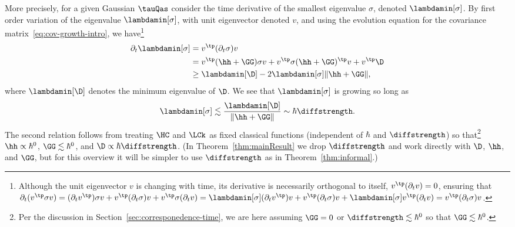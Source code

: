 \documentclass{article}
\numberwithin{equation}{section}
\begin{document}
More precisely, for a given Gaussian $\tauQas$ consider the time derivative of the smallest eigenvalue $\sigma$, denoted $\lambdamin[\sigma]$.
By first order variation
of the eigenvalue $\lambdamin[\sigma]$, with unit eigenvector denoted $v$, and using the evolution equation for the covariance matrix~\eqref{eq:cov-growth-intro},
we have\footnote{Although the unit eigenvector $v$ is changing with time, its derivative is necessarily orthogonal to itself, $v^\tp (\partial_t v)=0$, ensuring that $\partial_t (v^\tp \sigma v) = (\partial_t v^\tp) \sigma v + v^\tp (\partial_t \sigma) v + v^\tp \sigma(\partial_t v) = \lambdamin[\sigma](\partial_t v^\tp) v + v^\tp (\partial_t \sigma) v + \lambdamin[\sigma] v^\tp (\partial_t v) = v^\tp (\partial_t \sigma) v$.}
\begin{equation} \label{eq:overview-lambdamin}
    \begin{split}
        \partial_t \lambdamin[\sigma]
        &= v^\tp(\partial_t \sigma) v \\
        &= v^\tp (\hh+\GG) \sigma v + v^\tp \sigma (\hh+\GG)^\tp v
        + v^\tp \D\\
        &\geq \lambdamin[\D] - 2\lambdamin[\sigma] \|\hh+\GG\| ,
    \end{split}
\end{equation}
where $\lambdamin[\D]$ denotes the minimum eigenvalue of $\D$. 
We see that $\lambdamin[\sigma]$
is growing so long as 
\begin{align}
    \lambdamin[\sigma] \lesssim \frac{\lambdamin[\D]}{\|\hh+\GG\|} \sim \hbar \diffstrength.
\end{align}
The second relation follows from treating $\HC$ and $\LCk$ as fixed classical functions (independent of $\hbar$ and $\diffstrength$) so that\footnote{Per the discussion in Section~\ref{sec:corresponedence-time}, we are here assuming $\GG = 0$ or $\diffstrength \lesssim \hbar^{0}$ so that $\GG \lesssim \hbar^0$.} $\hh\propto \hbar^0$, $\GG\lesssim \hbar^0$, and $\D \propto \hbar\diffstrength$.
(In Theorem~\ref{thm:mainResult} we drop $\diffstrength$ and work directly with $\D$, $\hh$, and $\GG$, but for this overview it will be simpler to use $\diffstrength$ as in Theorem~\ref{thm:informal}.)
\end{document}
